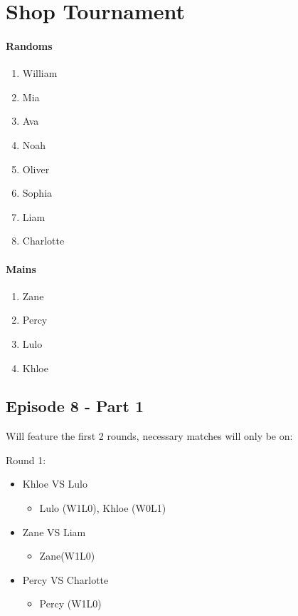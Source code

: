 \section{Shop Tournament}
\paragraph{Randoms}
\begin{enumerate}
   \item William
   \item Mia
   \item Ava
   \item Noah
   \item Oliver
   \item Sophia
   \item Liam
   \item Charlotte
\end{enumerate}

\paragraph{Mains}
\begin{enumerate}
   \item Zane
   \item Percy
   \item Lulo
   \item Khloe
\end{enumerate}

\subsection*{Episode 8 - Part 1}
Will feature the first 2 rounds, necessary matches will only be on:
\par \noindent Round 1:
\begin{itemize}
   \item Khloe VS Lulo
   \begin{itemize}
      \item Lulo (W1L0), Khloe (W0L1)
   \end{itemize}
   \item Zane VS Liam
   \begin{itemize}
      \item Zane(W1L0)
   \end{itemize}
   \item Percy VS Charlotte
   \begin{itemize}
      \item Percy (W1L0)
   \end{itemize}
\end{itemize}

